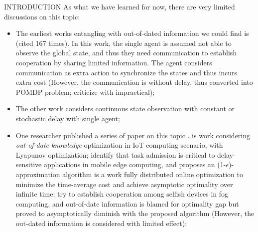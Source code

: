 \documentclass[10pt, conference, letterpaper]{IEEEtran}
\begin{document}
\begin{section}{INTRODUCTION}
        As what we have learned for now, there are very limited discussions on this topic:
        \begin{itemize}
            \item The earliest works entangling with out-of-dated information we could find is \cite{ref-01} (cited 167 times). In this work, the single agent is assumed not able to observe the global state, and thus they need communication to establish cooperation by sharing limited information. The agent considers communication as extra action to synchronize the states and thus incurs extra cost (However, the communication is without delay, thus converted into POMDP problem; criticize with impractical);
            \item The other work \cite{ref-02} considers continuous state observation with constant or stochastic delay with single agent;
            \item One researcher published a series of paper on this topic \cite{Lyu2017,Lyu2018,Lyu2018a,Lyu2018b}.
                \cite{Lyu2017} is work considering \emph{out-of-date knowledge} optimization in IoT computing scenario, with Lyapunov optimization;
                 \cite{Lyu2018} identify that task admission is critical to delay-sensitive applications in mobile edge computing, and proposes an (1-$\epsilon$)-approximation algorithm
                 \cite{Lyu2018a} is a work fully distributed online optimization to minimize the time-average cost and achieve asymptotic optimality over infinite time;
                \cite{Lyu2018b} try to establish cooperation among selfish devices in fog computing, and out-of-date information is blamed for optimality gap but proved to asymptotically diminish with the proposed algorithm (However, the out-dated information is considered with limited effect);
        \end{itemize}


\end{section}
\end{document}
